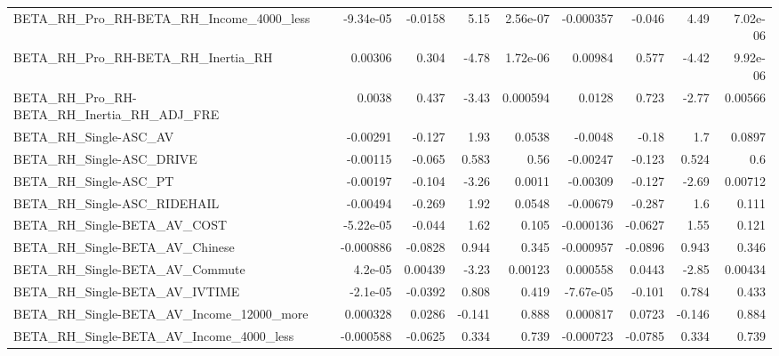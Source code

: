 \begin{tabular}{lrrrrrrrr}
BETA\_RH\_Pro\_RH-BETA\_RH\_Income\_4000\_less            &   -9.34e-05 &      -0.0158 &     5.15 & 2.56e-07 &  -0.000357 &      -0.046 &         4.49 &      7.02e-06 \\
BETA\_RH\_Pro\_RH-BETA\_RH\_Inertia\_RH                  &     0.00306 &        0.304 &    -4.78 & 1.72e-06 &    0.00984 &       0.577 &        -4.42 &      9.92e-06 \\
BETA\_RH\_Pro\_RH-BETA\_RH\_Inertia\_RH\_ADJ\_FRE          &      0.0038 &        0.437 &    -3.43 & 0.000594 &     0.0128 &       0.723 &        -2.77 &       0.00566 \\
BETA\_RH\_Single-ASC\_AV                              &    -0.00291 &       -0.127 &     1.93 &   0.0538 &    -0.0048 &       -0.18 &          1.7 &        0.0897 \\
BETA\_RH\_Single-ASC\_DRIVE                           &    -0.00115 &       -0.065 &    0.583 &     0.56 &   -0.00247 &      -0.123 &        0.524 &           0.6 \\
BETA\_RH\_Single-ASC\_PT                              &    -0.00197 &       -0.104 &    -3.26 &   0.0011 &   -0.00309 &      -0.127 &        -2.69 &       0.00712 \\
BETA\_RH\_Single-ASC\_RIDEHAIL                        &    -0.00494 &       -0.269 &     1.92 &   0.0548 &   -0.00679 &      -0.287 &          1.6 &         0.111 \\
BETA\_RH\_Single-BETA\_AV\_COST                        &   -5.22e-05 &       -0.044 &     1.62 &    0.105 &  -0.000136 &     -0.0627 &         1.55 &         0.121 \\
BETA\_RH\_Single-BETA\_AV\_Chinese                     &   -0.000886 &      -0.0828 &    0.944 &    0.345 &  -0.000957 &     -0.0896 &        0.943 &         0.346 \\
BETA\_RH\_Single-BETA\_AV\_Commute                     &     4.2e-05 &      0.00439 &    -3.23 &  0.00123 &   0.000558 &      0.0443 &        -2.85 &       0.00434 \\
BETA\_RH\_Single-BETA\_AV\_IVTIME                      &    -2.1e-05 &      -0.0392 &    0.808 &    0.419 &  -7.67e-05 &      -0.101 &        0.784 &         0.433 \\
BETA\_RH\_Single-BETA\_AV\_Income\_12000\_more           &    0.000328 &       0.0286 &   -0.141 &    0.888 &   0.000817 &      0.0723 &       -0.146 &         0.884 \\
BETA\_RH\_Single-BETA\_AV\_Income\_4000\_less            &   -0.000588 &      -0.0625 &    0.334 &    0.739 &  -0.000723 &     -0.0785 &        0.334 &         0.739 \\

\end{tabular}
